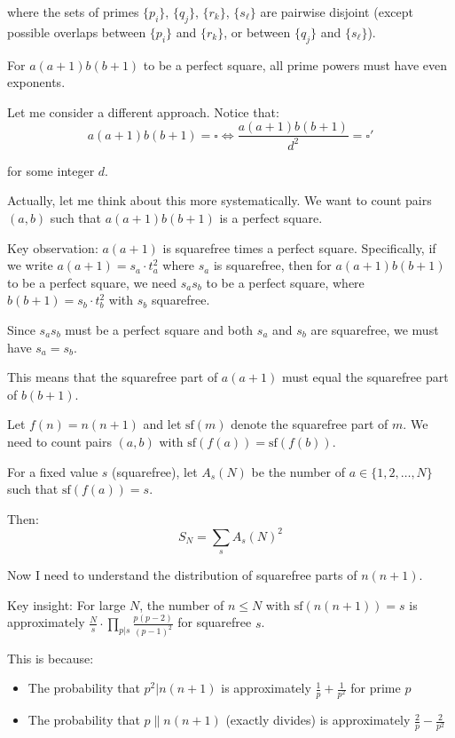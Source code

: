 \documentclass[12pt,a4paper]{article}
\theoremstyle{definition}
\begin{document}
    where the sets of primes $\{p_i\}$, $\{q_j\}$, $\{r_k\}$, $\{s_\ell\}$ are pairwise disjoint (except possible overlaps between $\{p_i\}$ and $\{r_k\}$, or between $\{q_j\}$ and $\{s_\ell\}$).

    For $a(a+1)b(b+1)$ to be a perfect square, all prime powers must have even exponents.

    Let me consider a different approach. Notice that:
    $$a(a+1)b(b+1) = \square \iff \frac{a(a+1)b(b+1)}{d^2} = \square'$$

    for some integer $d$.

    Actually, let me think about this more systematically. We want to count pairs $(a,b)$ such that $a(a+1)b(b+1)$ is a perfect square.

    Key observation: $a(a+1)$ is squarefree times a perfect square. Specifically, if we write $a(a+1) = s_a \cdot t_a^2$ where $s_a$ is squarefree, then for $a(a+1)b(b+1)$ to be a perfect square, we need $s_a s_b$ to be a perfect square, where $b(b+1) = s_b \cdot t_b^2$ with $s_b$ squarefree.

    Since $s_a s_b$ must be a perfect square and both $s_a$ and $s_b$ are squarefree, we must have $s_a = s_b$.

    This means that the squarefree part of $a(a+1)$ must equal the squarefree part of $b(b+1)$.

    Let $f(n) = n(n+1)$ and let $\text{sf}(m)$ denote the squarefree part of $m$. We need to count pairs $(a,b)$ with $\text{sf}(f(a)) = \text{sf}(f(b))$.

    For a fixed value $s$ (squarefree), let $A_s(N)$ be the number of $a \in \{1,2,\ldots,N\}$ such that $\text{sf}(f(a)) = s$.

    Then:
    $$S_N = \sum_s A_s(N)^2$$

    Now I need to understand the distribution of squarefree parts of $n(n+1)$.

    Key insight: For large $N$, the number of $n \leq N$ with $\text{sf}(n(n+1)) = s$ is approximately $\frac{N}{s} \cdot \prod_{p|s} \frac{p(p-2)}{(p-1)^2}$ for squarefree $s$.

    This is because:
    \begin{itemize}
        \item The probability that $p^2 | n(n+1)$ is approximately $\frac{1}{p} + \frac{1}{p^2}$ for prime $p$
        \item The probability that $p \parallel n(n+1)$ (exactly divides) is approximately $\frac{2}{p} - \frac{2}{p^2}$
    \end{itemize}
\end{document}
